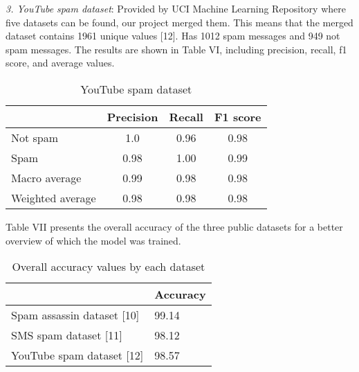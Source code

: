 \indent \textit{3. YouTube spam dataset}: Provided by UCI Machine Learning Repository where five datasets can be found, our project merged them. This means that the merged dataset contains 1961 unique values [12]. Has 1012 spam messages and 949 not spam messages. The results are shown in Table VI, including precision, recall, f1 score, and average values.
\begin{table}[H]
    \begin{center}
    \label{yt_spam_dataset}
    \caption{YouTube spam dataset}
    \small
        \begin{tabularx}{\columnwidth}{| X | c | c | c |}
            \hline
             & Precision & Recall & F1 score \\
            \hline
            Not spam & 1.0 & 0.96 & 0.98 \\
            \hline
            Spam & 0.98 & 1.00 & 0.99 \\
            \hline
            Macro average & 0.99 & 0.98 & 0.98 \\
            \hline
            Weighted average & 0.98 & 0.98 & 0.98 \\
            \hline
        \end{tabularx}
    \end{center}
\end{table}

\indent Table VII presents the overall accuracy of the three public datasets for a better overview of which the model was trained.
\begin{table}[htp]
    \centering
    \label{accuracy}
    \caption{Overall accuracy values by each dataset}
    \small
    \begin{tabularx}{\columnwidth}{| X | X |}
        \hline
        & Accuracy \\
        \hline
        Spam assassin dataset [10] & 99.14 \\
        \hline
        SMS spam dataset [11] & 98.12 \\
        \hline
        YouTube spam dataset [12] & 98.57 \\
        \hline
    \end{tabularx}
\end{table}